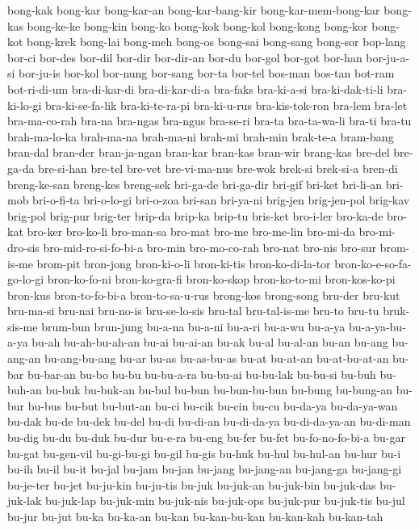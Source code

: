 {bong-kak bong-kar bong-kar-an bong-kar-bang-kir bong-kar-mem-bong-kar
bong-kas bong-ke-ke bong-kin bong-ko bong-kok bong-kol bong-kong bong-kor
bong-kot bong-krek bong-lai bong-meh bong-os bong-sai bong-sang bong-sor
bop-lang bor-ci bor-des bor-dil bor-dir bor-dir-an bor-du bor-gol bor-got
bor-han bor-ju-a-si bor-ju-is bor-kol bor-nung bor-sang bor-ta bor-tel
bos-man bos-tan bot-ram bot-ri-di-um bra-di-kar-di bra-di-kar-di-a
bra-faks bra-ki-a-si bra-ki-dak-ti-li bra-ki-lo-gi bra-ki-se-fa-lik
bra-ki-te-ra-pi bra-ki-u-rus bra-kis-tok-ron bra-lem bra-let bra-ma-co-rah
bra-na bra-ngas bra-ngus bra-se-ri bra-ta bra-ta-wa-li bra-ti bra-tu
brah-ma-lo-ka brah-ma-na brah-ma-ni brah-mi brah-min brak-te-a bram-bang
bran-dal bran-der bran-ja-ngan bran-kar bran-kas bran-wir brang-kas
bre-del bre-ga-da bre-si-han bre-tel bre-vet bre-vi-ma-nus bre-wok brek-si
brek-si-a bren-di breng-ke-san breng-kes breng-sek bri-ga-de bri-ga-dir
bri-gif bri-ket bri-li-an bri-mob bri-o-fi-ta bri-o-lo-gi bri-o-zoa
bri-san bri-ya-ni brig-jen brig-jen-pol brig-kav brig-pol brig-pur
brig-ter brip-da brip-ka brip-tu bris-ket bro-i-ler bro-ka-de bro-kat
bro-ker bro-ko-li bro-man-sa bro-mat bro-me bro-me-lin bro-mi-da
bro-mi-dro-sis bro-mid-ro-si-fo-bi-a bro-min bro-mo-co-rah bro-nat bro-nis
bro-sur brom-is-me brom-pit bron-jong bron-ki-o-li bron-ki-tis
bron-ko-di-la-tor bron-ko-e-so-fa-go-lo-gi bron-ko-fo-ni bron-ko-gra-fi
bron-ko-skop bron-ko-to-mi bron-kos-ko-pi bron-kus bron-to-fo-bi-a
bron-to-sa-u-rus brong-kos brong-song bru-der bru-kut bru-ma-si bru-nai
bru-no-is bru-se-lo-sis bru-tal bru-tal-is-me bru-to bru-tu bruk-sis-me
brum-bun brun-jung bu-a-na bu-a-ni bu-a-ri bu-a-wu bu-a-ya bu-a-ya-bu-a-ya
bu-ah bu-ah-bu-ah-an bu-ai bu-ai-an bu-ak bu-al bu-al-an bu-an bu-ang
bu-ang-an bu-ang-bu-ang bu-ar bu-as bu-as-bu-as bu-at bu-at-an
bu-at-bu-at-an bu-bar bu-bar-an bu-bo bu-bu bu-bu-a-ra bu-bu-ai bu-bu-lak
bu-bu-si bu-buh bu-buh-an bu-buk bu-buk-an bu-bul bu-bun bu-bun-bu-bun
bu-bung bu-bung-an bu-bur bu-bus bu-but bu-but-an bu-ci bu-cik bu-cin
bu-cu bu-da-ya bu-da-ya-wan bu-dak bu-de bu-dek bu-del bu-di bu-di-an
bu-di-da-ya bu-di-da-ya-an bu-di-man bu-dig bu-du bu-duk bu-dur bu-e-ra
bu-eng bu-fer bu-fet bu-fo-no-fo-bi-a bu-gar bu-gat bu-gen-vil bu-gi-bu-gi
bu-gil bu-gis bu-huk bu-hul bu-hul-an bu-hur bu-i bu-ih bu-il bu-it bu-jal
bu-jam bu-jan bu-jang bu-jang-an bu-jang-ga bu-jang-gi bu-je-ter bu-jet
bu-ju-kin bu-ju-tis bu-juk bu-juk-an bu-juk-bin bu-juk-das bu-juk-lak
bu-juk-lap bu-juk-min bu-juk-nis bu-juk-ops bu-juk-pur bu-juk-tis bu-jul
bu-jur bu-jut bu-ka bu-ka-an bu-kan bu-kan-bu-kan bu-kan-kah bu-kan-tah
}
